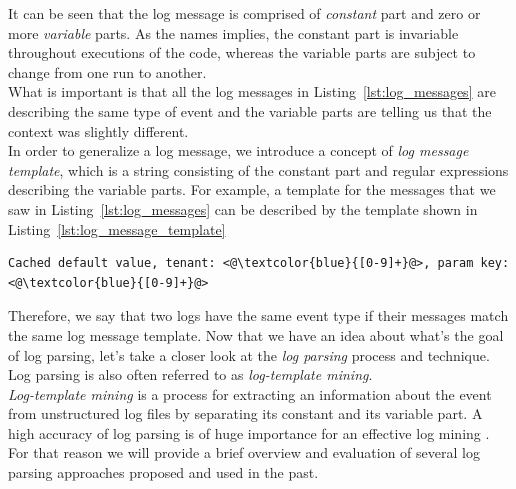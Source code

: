It can be seen that the log message is comprised of \textit{constant} part and zero or more \textit{variable} parts.
As the names implies, the constant part is invariable throughout executions of the code, whereas the variable parts are subject to change from one run to another.\\

What is important is that all the log messages in Listing~\ref{lst:log_messages} are describing the same type of event and the variable parts are telling us that the context was slightly different. \\

In order to generalize a log message, we introduce a concept of \textit{log message template}, which is a string consisting of the constant part and regular expressions describing the variable parts. For example, a template for the messages that we saw in Listing~\ref{lst:log_messages} can be described by the template shown in Listing~\ref{lst:log_message_template}\\

\begin{lstlisting}[label={lst:log_message_template}, caption={Template for log messages in Listing ~\ref{lst:log_messages}, regular expressions are denoted in blue.}, captionpos=b]
Cached default value, tenant: <@\textcolor{blue}{[0-9]+}@>, param key: <@\textcolor{blue}{[0-9]+}@> 
\end{lstlisting}
Therefore, we say that two logs have the same event type if their messages match the same log message template. Now that we have an idea about what's the goal of log parsing, let's take a closer look at the \textit{log parsing} process and technique. Log parsing is also often referred to as \textit{log-template mining}. \\


\textit{Log-template mining} is a process for extracting an information about the event from unstructured log files by separating its constant and its variable part. A high accuracy of log parsing is of huge importance for an effective log mining \cite{logParsingEvaluation2016}. For that reason we will provide a brief overview and evaluation of several log parsing approaches proposed and used in the past. \\
    
